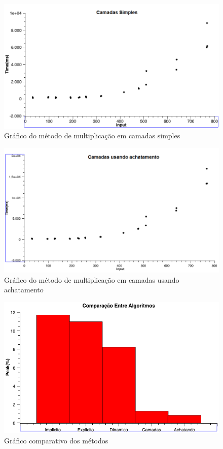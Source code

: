 \documentclass[a4paper, 10pt]{article}
\begin{document}
\vspace{3cm}
\begin{figure}[!h]
\centering
\includegraphics[scale=0.35]{camadas_simples}
\caption{Gráfico do método de multiplicação em camadas simples}
\label{Gráfico camadas simples}
\end{figure}
\newpage
\begin{figure}[!h]
\centering
\includegraphics[scale=0.35]{camadas_achatamento}
\caption{Gráfico do método de multiplicação em camadas usando achatamento}
\label{Gráfico camadas achatando}
\end{figure}
\vspace{3cm}
\begin{figure}[!h]
\centering
\includegraphics[scale=0.5]{comparacao_algoritmos}
\caption{Gráfico comparativo dos métodos}
\label{Gráfico comparativo}
\end{figure}
\end{document}
